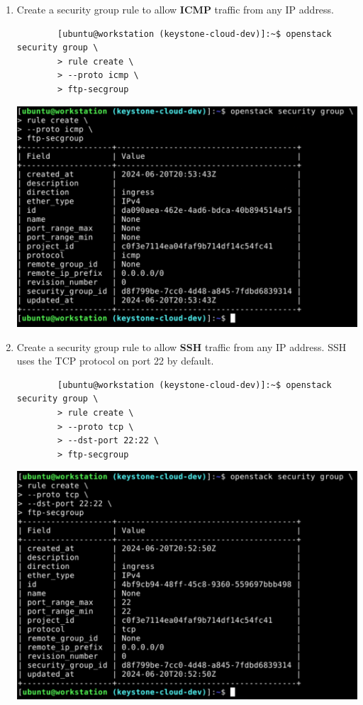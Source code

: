 \documentclass[letterpaper, 12pt]{article}
\begin{document}
\begin{enumerate}
    \item Create a security group rule to allow \textbf{ICMP} traffic from any IP address.
    \begin{lstlisting}
        [ubuntu@workstation (keystone-cloud-dev)]:~$ openstack security group \
        > rule create \
        > --proto icmp \
        > ftp-secgroup
    \end{lstlisting}

    \begin{center}
        \includegraphics[width=\linewidth]{images/part1/step33.png}
    \end{center}

    \item Create a security group rule to allow \textbf{SSH} traffic from any IP address. SSH uses the TCP protocol on
    port 22 by default.
    \begin{lstlisting}
        [ubuntu@workstation (keystone-cloud-dev)]:~$ openstack security group \
        > rule create \
        > --proto tcp \
        > --dst-port 22:22 \
        > ftp-secgroup
    \end{lstlisting}

    \begin{center}
        \includegraphics[width=\linewidth]{images/part1/step34.png}
    \end{center}


\end{enumerate}
\end{document}
